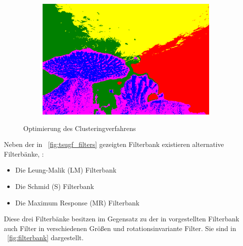 \begin{figure}[h!]
\begin{subfigure}[t]{0.32\textwidth}
		\includegraphics[width=\textwidth,keepaspectratio]{images/gen/optims/101027.jpg_blur_norm_spatial_color.png}
	\end{subfigure}
	\hfill
	\begin{subfigure}[t]{0.32\textwidth}
		\hfill
	\end{subfigure}
	\caption{Optimierung des Clusteringverfahrens}
	\label{fig:tsugf_optim}
\end{figure}

Neben der in \figurename~\ref{fig:tsugf_filters} gezeigten Filterbank existieren alternative Filterbänke, \ua:
\begin{itemize}
	\item Die Leung-Malik (LM) Filterbank \cite{leung_01}
	\item Die Schmid (S) Filterbank \cite{schmid_01}
	\item Die Maximum Response (MR) Filterbank \cite{visgeo}
\end{itemize}

Diese drei Filterbänke besitzen im Gegensatz zu der in \cite{mathworks_15} vorgestellten Filterbank auch Filter in verschiedenen Größen und rotationsinvariante Filter. Sie sind in \figurename~\ref{fig:filterbank} dargestellt.


